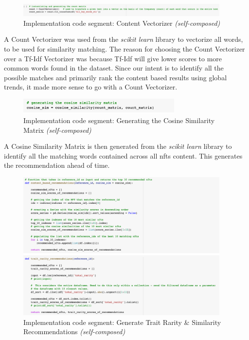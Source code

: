 \begin{figure}[h!]
\centering
\includegraphics[width=0.95\textwidth]{images/Implementation/code/content vectorizer.png}
\caption{Implementation code segment: Content Vectorizer \textit{(self-composed)}}
\label{fig:code-content-vectorizer}
\end{figure}

A Count Vectorizer was used from the \textit{scikit learn} library to vectorize all words, to be used for similarity matching. The reason for choosing the Count Vectorizer over a Tf-Idf Vectorizer was because Tf-Idf will give lower scores to more common words found in the dataset. Since our intent is to identify all the possible matches and primarily rank the content based results using global trends, it made more sense to go with a Count Vectorizer.

\begin{figure}[h!]
\centering
\includegraphics[width=0.73\textwidth]{images/Implementation/code/cosine-matrix.png}
\caption{Implementation code segment: Generating the Cosine Similarity Matrix \textit{(self-composed)}}
\label{fig:code-cosine-matrix}
\end{figure}
A Cosine Similarity Matrix is then generated from the \textit{scikit learn} library to identify all the matching words contained across all \gls{nft}s content. This generates the recommendation ahead of time.

\begin{figure}[h!]
\centering
\includegraphics[width=0.95\textwidth]{images/Implementation/code/trait-rarity-similarity functions.png}
\caption{Implementation code segment: Generate Trait Rarity \& Similarity Recommendations \textit{(self-composed)}}
\label{fig:code-trait-rarity-rec}
\end{figure}

